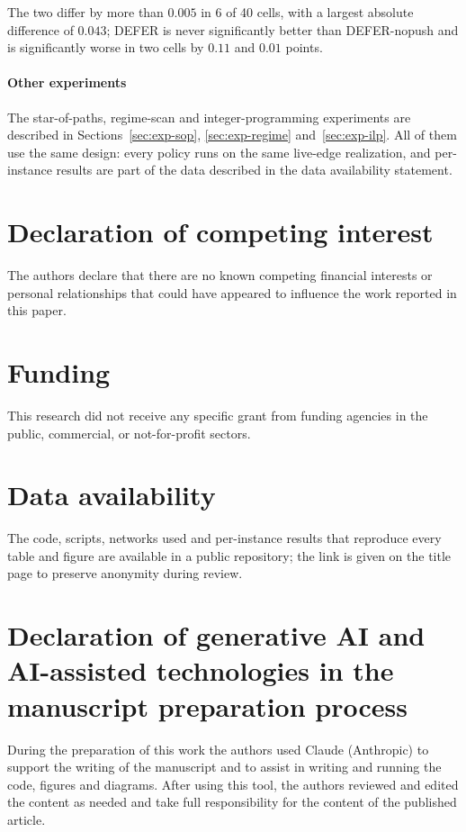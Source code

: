 \documentclass[preprint,11pt]{elsarticle}
\theoremstyle{definition}
\theoremstyle{remark}
\begin{document}
The two differ by more than $0.005$ in 6 of 40 cells, with a largest absolute difference of $0.043$; DEFER is never significantly better than DEFER-nopush and is significantly worse in two cells by $0.11$ and $0.01$ points.

\paragraph{Other experiments} The star-of-paths, regime-scan and integer-programming experiments are described in Sections~\ref{sec:exp-sop}, \ref{sec:exp-regime} and~\ref{sec:exp-ilp}. All of them use the same design: every policy runs on the same live-edge realization, and per-instance results are part of the data described in the data availability statement.

\section*{Declaration of competing interest}
The authors declare that there are no known competing financial interests or personal relationships that could have appeared to influence the work reported in this paper.

\section*{Funding}
This research did not receive any specific grant from funding agencies in the public, commercial, or not-for-profit sectors.

\section*{Data availability}
The code, scripts, networks used and per-instance results that reproduce every table and figure are available in a public repository; the link is given on the title page to preserve anonymity during review.

\section*{Declaration of generative AI and AI-assisted technologies in the manuscript preparation process}
During the preparation of this work the authors used Claude (Anthropic) to support the writing of the manuscript and to assist in writing and running the code, figures and diagrams. After using this tool, the authors reviewed and edited the content as needed and take full responsibility for the content of the published article.
\end{document}
